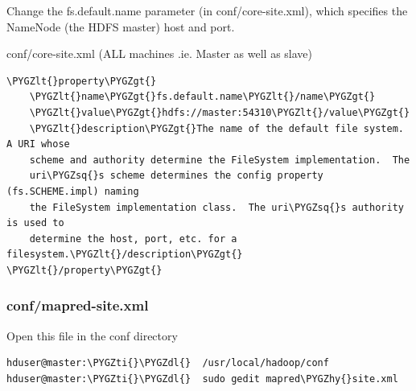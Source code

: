 \documentclass[a4paper,12pt,oneside]{sphinxmanual}
\def\PYGZlt{\char`\<}
\def\PYGZgt{\char`\>}
\def\PYGZdl{\char`\$}
\def\PYGZhy{\char`\-}
\def\PYGZsq{\char`\'}
\def\PYGZti{\char`\~}
\begin{document}
Change the fs.default.name parameter (in conf/core-site.xml), which specifies the NameNode (the HDFS master) host and port.

conf/core-site.xml (ALL machines .ie. Master as well as slave)

\begin{Verbatim}[commandchars=\\\{\}]
\PYGZlt{}property\PYGZgt{}
    \PYGZlt{}name\PYGZgt{}fs.default.name\PYGZlt{}/name\PYGZgt{}
    \PYGZlt{}value\PYGZgt{}hdfs://master:54310\PYGZlt{}/value\PYGZgt{}
    \PYGZlt{}description\PYGZgt{}The name of the default file system.  A URI whose
    scheme and authority determine the FileSystem implementation.  The
    uri\PYGZsq{}s scheme determines the config property (fs.SCHEME.impl) naming
    the FileSystem implementation class.  The uri\PYGZsq{}s authority is used to
    determine the host, port, etc. for a filesystem.\PYGZlt{}/description\PYGZgt{}
\PYGZlt{}/property\PYGZgt{}
\end{Verbatim}
\begin{figure}[htbp]
\centering

\end{figure}


\subsubsection{conf/mapred-site.xml}
\label{document:conf-mapred-site-xml}
Open this file in the conf directory

\begin{Verbatim}[commandchars=\\\{\}]
hduser@master:\PYGZti{}\PYGZdl{}  /usr/local/hadoop/conf
hduser@master:\PYGZti{}\PYGZdl{}  sudo gedit mapred\PYGZhy{}site.xml
\end{Verbatim}
\end{document}
